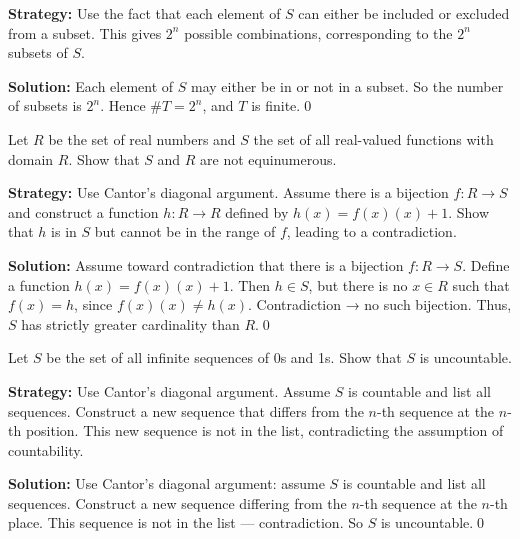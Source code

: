 \noindent\textbf{Strategy:} Use the fact that each element of $S$ can either be included or excluded from a subset. This gives $2^n$ possible combinations, corresponding to the $2^n$ subsets of $S$.

\bigskip\noindent\textbf{Solution:}  
Each element of \( S \) may either be in or not in a subset.  
So the number of subsets is \( 2^n \). Hence \( \#T = \textbf{$2^n$} \), and \( T \) is finite.\qed



\begin{problembox}
\begin{problemstatement}
Let \( R \) be the set of real numbers and \( S \) the set of all real-valued functions with domain \( R \).  
Show that \( S \) and \( R \) are not equinumerous.
\end{problemstatement}
\end{problembox}

\noindent\textbf{Strategy:} Use Cantor's diagonal argument. Assume there is a bijection $f: R \to S$ and construct a function $h: R \to R$ defined by $h(x) = f(x)(x) + 1$. Show that $h$ is in $S$ but cannot be in the range of $f$, leading to a contradiction.

\bigskip\noindent\textbf{Solution:}  
Assume toward contradiction that there is a bijection \( f: R \to S \).  
Define a function \( h(x) = f(x)(x) + 1 \). Then \( h \in S \), but there is no \( x \in R \) such that \( f(x) = h \), since \( f(x)(x) \ne h(x) \).  
Contradiction → no such bijection. Thus, \( S \) has strictly greater cardinality than \( R \).\qed



\begin{problembox}
\begin{problemstatement}
Let \( S \) be the set of all infinite sequences of 0s and 1s. Show that \( S \) is uncountable.
\end{problemstatement}
\end{problembox}

\noindent\textbf{Strategy:} Use Cantor's diagonal argument. Assume $S$ is countable and list all sequences. Construct a new sequence that differs from the $n$-th sequence at the $n$-th position. This new sequence is not in the list, contradicting the assumption of countability.

\bigskip\noindent\textbf{Solution:}  
Use Cantor's diagonal argument: assume \( S \) is countable and list all sequences.  
Construct a new sequence differing from the \( n \)-th sequence at the \( n \)-th place.  
This sequence is not in the list — contradiction. So \( S \) is uncountable.\qed




